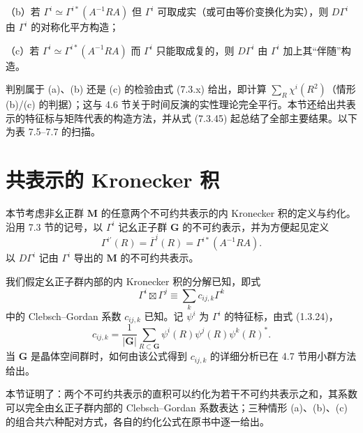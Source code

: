 \noindent（b）若 $\Gamma^{i} \simeq \Gamma^{i*}(A^{-1}RA)$ 但 $\Gamma^{i}$ 可取成实（或可由等价变换化为实），则 $D\Gamma^{i}$ 由 $\Gamma^{i}$ 的对称化平方构造；

\noindent（c）若 $\Gamma^{i} \simeq \Gamma^{i*}(A^{-1}RA)$ 而 $\Gamma^{i}$ 只能取成复的，则 $D\Gamma^{i}$ 由 $\Gamma^{i}$ 加上其“伴随”构造。

判别属于 (a)、(b) 还是 (c) 的检验由式 (7.3.x) 给出，即计算 $\sum_{R}\chi^{i}(R^{2})$（情形 (b)/(c) 的判据）；这与 4.6 节关于时间反演的实性理论完全平行。本节还给出共表示的特征标与矩阵代表的构造方法，并从式 (7.3.45) 起总结了全部主要结果。以下为表 7.5--7.7 的扫描。



\section{共表示的 Kronecker 积}

本节考虑非幺正群 $\mathbf{M}$ 的任意两个不可约共表示的内 Kronecker 积的定义与约化。沿用 7.3 节的记号，以 $\Gamma^{i}$ 记幺正子群 $\mathbf{G}$ 的不可约表示，并为方便起见定义
\begin{equation*}
\Gamma^{i'}(R) = \overline{\Gamma}^{i}(R) = \Gamma^{i*}(A^{-1}RA).
\tag{7.4.1}
\end{equation*}
以 $D\Gamma^{i}$ 记由 $\Gamma^{i}$ 导出的 $\mathbf{M}$ 的不可约共表示。

我们假定幺正子群内部的内 Kronecker 积的分解已知，即式
\begin{equation*}
\Gamma^{i} \boxtimes \Gamma^{j} \equiv \sum_{k}c_{ij, k}\Gamma^{k}
\tag{7.4.2}
\end{equation*}
中的 Clebsch--Gordan 系数 $c_{ij, k}$ 已知。记 $\psi^{i}$ 为 $\Gamma^{i}$ 的特征标，由式 (1.3.24)，
\begin{equation*}
c_{ij, k} = \frac{1}{|\mathbf{G}|}\sum_{R \subset \mathbf{G}}\psi^{i}(R)\psi^{j}(R)\psi^{k}(R)^{*}.
\tag{7.4.3}
\end{equation*}
当 $\mathbf{G}$ 是晶体空间群时，如何由该公式得到 $c_{ij, k}$ 的详细分析已在 4.7 节用小群方法给出。

本节证明了：两个不可约共表示的直积可以约化为若干不可约共表示之和，其系数可以完全由幺正子群内部的 Clebsch--Gordan 系数表达；三种情形 (a)、(b)、(c) 的组合共六种配对方式，各自的约化公式在原书中逐一给出。

